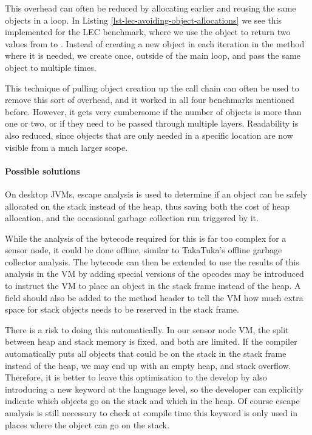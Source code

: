 This overhead can often be reduced by allocating earlier and reusing the same objects in a loop. In Listing \ref{lst-lec-avoiding-object-allocations} we see this implemented for the LEC benchmark, where we use the  object to return two values from  to . Instead of creating a new object in each iteration in the  method where it is needed, we create  once, outside of the main loop, and pass the same object to  multiple times.

This technique of pulling object creation up the call chain can often be used to remove this sort of overhead, and it worked in all four benchmarks mentioned before. However, it gets very cumbersome if the number of objects is more than one or two, or if they need to be passed through multiple layers. Readability is also reduced, since objects that are only needed in a specific location are now visible from a much larger scope.

\paragraph{Possible solutions}
On desktop JVMs, escape analysis \cite{Choi:1999uw, Goetz:2005uy} is used to determine if an object can be safely allocated on the stack instead of the heap, thus saving both the cost of heap allocation, and the occasional garbage collection run triggered by it.

While the analysis of the bytecode required for this is far too complex for a sensor node, it could be done offline, similar to TakaTuka's offline garbage collector analysis. The bytecode can then be extended to use the results of this analysis in the VM by adding special versions of the  opcodes may be introduced to instruct the VM to place an object in the stack frame instead of the heap. A field should also be added to the method header to tell the VM how much extra space for stack objects needs to be reserved in the stack frame.

There is a risk to doing this automatically. In our sensor node VM, the split between heap and stack memory is fixed, and both are limited. If the compiler automatically puts all objects that could be on the stack in the stack frame instead of the heap, we may end up with an empty heap, and stack overflow. Therefore, it is better to leave this optimisation to the develop by also introducing a new keyword at the language level, so the developer can explicitly indicate which objects go on the stack and which in the heap. Of course escape analysis is still necessary to check at compile time this keyword is only used in places where the object can go on the stack.




